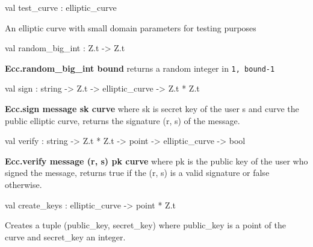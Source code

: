 \documentclass[12pt]{article}
\begin{document}
\begin{ocamldocsigend}
\begin{ocamldocdescription}
\end{ocamldocdescription}


\label{val:Ecc.Ecc.test-underscorecurve}\begin{ocamldoccode}
val test_curve : elliptic_curve
\end{ocamldoccode}
\begin{ocamldocdescription}
An elliptic curve with small domain parameters for testing purposes


\end{ocamldocdescription}


\label{val:Ecc.Ecc.random-underscorebig-underscoreint}\begin{ocamldoccode}
val random_big_int : Z.t -> Z.t
\end{ocamldoccode}
\begin{ocamldocdescription}
\textbf{Ecc.random\_big\_int bound} returns a random integer in {\tt{1, bound-1}}


\end{ocamldocdescription}


\label{val:Ecc.Ecc.sign}\begin{ocamldoccode}
val sign : string -> Z.t -> elliptic_curve -> Z.t * Z.t
\end{ocamldoccode}
\begin{ocamldocdescription}
\textbf{Ecc.sign message sk curve} where sk is secret key of the user s and curve 
       the public elliptic curve, returns the signature (r, s) of the message.


\end{ocamldocdescription}


\label{val:Ecc.Ecc.verify}\begin{ocamldoccode}
val verify : string -> Z.t * Z.t -> point -> elliptic_curve -> bool
\end{ocamldoccode}
\begin{ocamldocdescription}
\textbf{Ecc.verify message (r, s) pk curve} where pk is the public key of the user
       who signed the message, returns true if the (r, s) is a valid
       signature or false otherwise.


\end{ocamldocdescription}


\label{val:Ecc.Ecc.create-underscorekeys}\begin{ocamldoccode}
val create_keys : elliptic_curve -> point * Z.t
\end{ocamldoccode}
\begin{ocamldocdescription}
Creates a tuple (public\_key, secret\_key) where public\_key is a point of
       the curve and secret\_key an integer.


\end{ocamldocdescription}
\end{ocamldocsigend}
\end{document}
